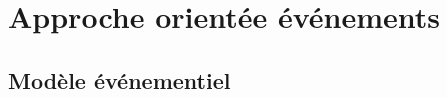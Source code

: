 
\section{Approche orientée événements}

\begin{frame}
	\begin{minipage}{0.5\columnwidth}
		
		\tableofcontents[
		currentsubsection,
		sectionstyle=show/shaded,
		subsectionstyle=show/show/hide,
		]
	\end{minipage}\hfill
	\begin{minipage}{0.5\columnwidth}
	\end{minipage}
\end{frame}


\subsection{Modèle événementiel}


